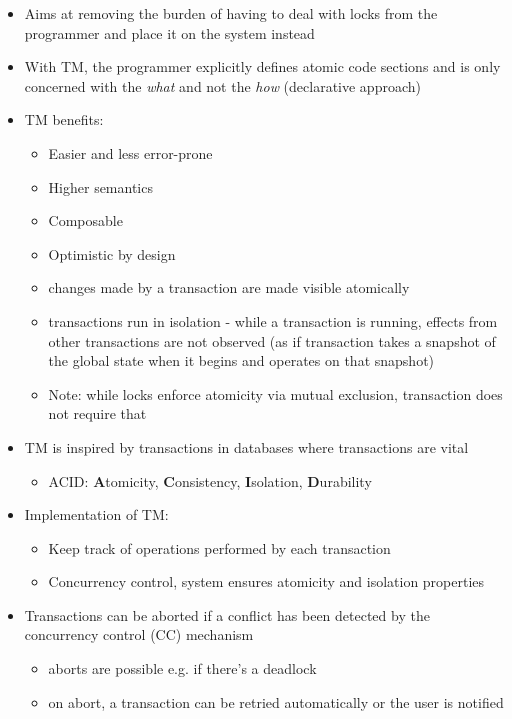 \documentclass[a4paper]{article}
\begin{document}
\begin{itemize}
\item Aims at removing the burden of having to deal with locks from the programmer and place it on the system instead
\item With TM, the programmer explicitly defines atomic code sections and is only concerned with the \textsl{what} and not the \textsl{how} (declarative approach)
\item TM benefits: 
\begin{itemize}
\item Easier and less error-prone
\item Higher semantics
\item Composable
\item Optimistic by design
\end{itemize}
\begin{itemize}
\item changes made by a transaction are made visible atomically
\item  transactions run in isolation - while a transaction is running, effects from other transactions are not observed (as if transaction takes a snapshot of the global state when it begins and operates on that snapshot)
\item Note: while locks enforce atomicity via mutual exclusion, transaction does not require that
\end{itemize}
\item TM is inspired by transactions in databases where transactions are vital 
\begin{itemize}
\item ACID: \textbf{A}tomicity, \textbf{C}onsistency, \textbf{I}solation, \textbf{D}urability
\end{itemize}
\item Implementation of TM:
\begin{itemize}
\item Keep track of operations performed by each transaction
\item Concurrency control, system ensures atomicity and isolation properties
\end{itemize}
\item Transactions can be aborted if a conflict has been detected by the concurrency control (CC) mechanism 
\begin{itemize}
\item aborts are possible e.g. if there’s a deadlock
\item on abort, a transaction can be retried automatically or the user is notified

\end{itemize}
\end{itemize}
\end{document}
